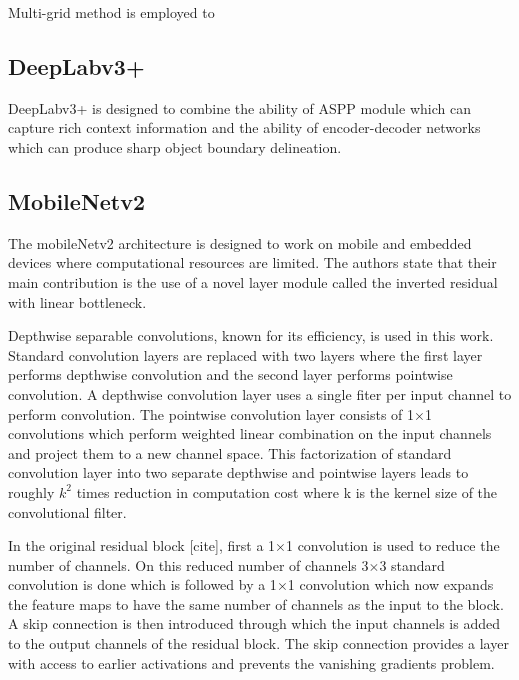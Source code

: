 Multi-grid method is employed to 

\subsection{DeepLabv3+}

DeepLabv3+ is designed to combine the ability of ASPP module which can capture rich context information and the ability of encoder-decoder networks which can produce sharp object boundary delineation. 

\subsection{MobileNetv2}



The mobileNetv2 architecture is designed to work on mobile and embedded devices where computational resources are limited. The authors state that their main contribution is the use of a novel layer module called the inverted residual with linear bottleneck. 

Depthwise separable convolutions, known for its efficiency, is used in this work. Standard convolution layers are replaced with two layers where the first layer performs depthwise convolution and the second layer performs pointwise convolution. A depthwise convolution layer uses a single fiter per input channel to perform convolution. The pointwise convolution layer consists of 1$\times$1 convolutions which perform weighted linear combination on the input channels and project them to a new channel space. This factorization of standard convolution layer into two separate depthwise and pointwise layers leads to roughly $k^2$ times reduction in computation cost where k is the kernel size of the convolutional filter. 

In the original residual block [cite], first a 1$\times$1 convolution is used to reduce the number of channels. On this reduced number of channels 3$\times$3 standard convolution is done which is followed by a 1$\times$1 convolution which now expands the feature maps to have the same number of channels as the input to the block. A skip connection is then introduced through which the input channels is added to the output channels of the residual block. The skip connection provides a layer with access to earlier activations and prevents the vanishing gradients problem. 

